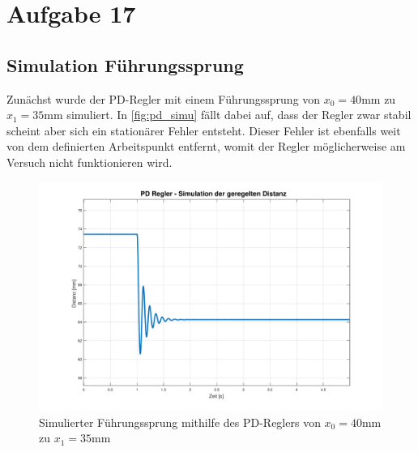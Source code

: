 \section{Aufgabe 17}\label{sec:Aufgabe17}
	\subsection*{Simulation Führungssprung}
	Zunächst wurde der PD-Regler mit einem Führungssprung von $x_0 = 40\si{\milli\meter}$ zu $x_1 = 35\si{\milli\meter}$ simuliert. In \autoref{fig:pd_simu} fällt dabei auf, dass der Regler zwar stabil scheint aber sich ein stationärer Fehler entsteht. Dieser Fehler ist ebenfalls weit von dem definierten Arbeitspunkt entfernt, womit der Regler möglicherweise am Versuch nicht funktionieren wird.
			\begin{figure}[H]
				\centering
				\includegraphics[width=\textwidth]{./figure/PD_simu.pdf}
				\caption{Simulierter Führungssprung mithilfe des PD-Reglers von $x_0 = 40\si{\milli\meter}$ zu $x_1 = 35\si{\milli\meter}$}
				\label{fig:pd_simu}
			\end{figure}


